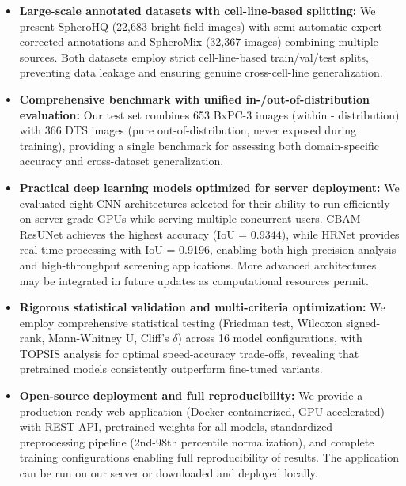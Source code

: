 \documentclass[preprint,12pt]{elsarticle}
\newcommand{\dsHQ}{SpheroHQ}
\newcommand{\dsMix}{SpheroMix}
\begin{document}
\begin{itemize}\setlength\itemsep{-0.2em}
    \item \textbf{Large-scale annotated datasets with cell-line-based splitting:} We present \dsHQ{} (22,683 bright-field images) with semi-automatic expert-corrected annotations and \dsMix{} (32,367 images) combining multiple sources. Both datasets employ strict cell-line-based train/val/test splits, preventing data leakage and ensuring genuine cross-cell-line generalization.
    
    \item \textbf{Comprehensive benchmark with unified in-/out-of-distribution evaluation:} Our test set combines 653 BxPC-3 images (within - distribution) with 366 DTS images (pure out-of-distribution, never exposed during training), providing a single benchmark for assessing both domain-specific accuracy and cross-dataset generalization.
    
    \item \textbf{Practical deep learning models optimized for server deployment:} We evaluated eight CNN architectures selected for their ability to run efficiently on server-grade GPUs while serving multiple concurrent users. CBAM-ResUNet achieves the highest accuracy (IoU = 0.9344), while HRNet provides real-time processing with IoU = 0.9196, enabling both high-precision analysis and high-throughput screening applications. More advanced architectures may be integrated in future updates as computational resources permit.
    
    \item \textbf{Rigorous statistical validation and multi-criteria optimization:} We employ comprehensive statistical testing (Friedman test, Wilcoxon signed-rank, Mann-Whitney U, Cliff's $\delta$) across 16 model configurations, with TOPSIS analysis for optimal speed-accuracy trade-offs, revealing that pretrained models consistently outperform fine-tuned variants.
    
    \item \textbf{Open-source deployment and full reproducibility:} We provide a production-ready web application (Docker-containerized, GPU-accelerated) with REST API, pretrained weights for all models, standardized preprocessing pipeline (2nd-98th percentile normalization), and complete training configurations enabling full reproducibility of results.  The application can be run on our server or downloaded and deployed locally.
\end{itemize}
\end{document}
